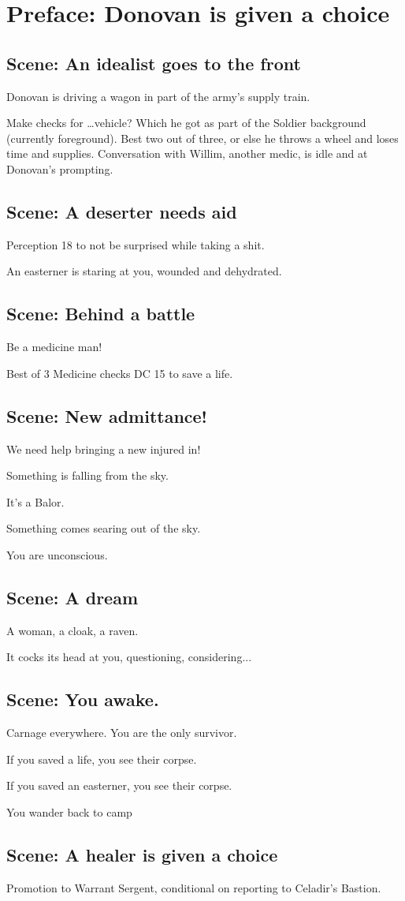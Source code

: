 \section{Preface: Donovan is given a choice}\label{sec:prefaceC:DonovanIsGivenAChoice}
\subsection{Scene: An idealist goes to the front}
Donovan is driving a wagon in part of the army's supply train.

Make checks for \ldots vehicle?
Which he got as part of the Soldier background (currently foreground).
Best two out of three, or else he throws a wheel and loses time and supplies.
Conversation with Willim, another medic, is idle and at Donovan's prompting.

\subsection{Scene: A deserter needs aid}
Perception 18 to not be surprised while taking a shit.

An easterner is staring at you, wounded and dehydrated.

\subsection{Scene: Behind a battle}
Be a medicine man!

Best of 3 Medicine checks DC 15 to save a life.

\subsection{Scene: New admittance!}
We need help bringing a new injured in!

Something is falling from the sky.

It's a Balor.

Something comes searing out of the sky.

You are unconscious.

\subsection{Scene: A dream}

A woman, a cloak, a raven.

It cocks its head at you, questioning, considering...

\subsection{Scene: You awake.}

Carnage everywhere.
You are the only survivor.

If you saved a life, you see their corpse.

If you saved an easterner, you see their corpse.

You wander back to camp

\subsection{Scene: A healer is given a choice}

Promotion to Warrant Sergent, conditional on reporting to Celadir's Bastion.
